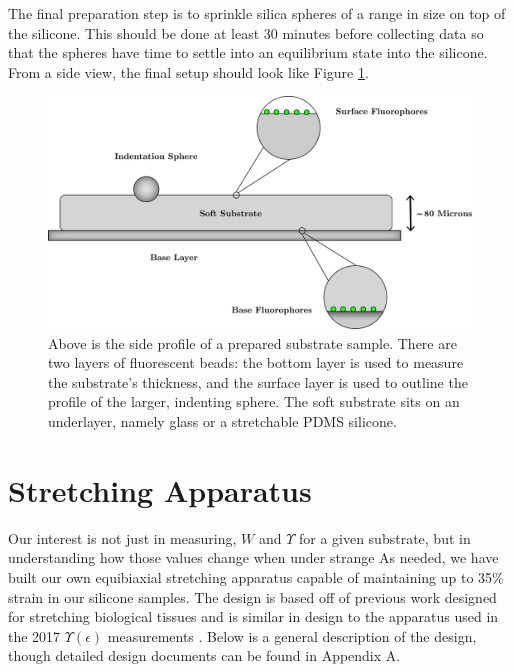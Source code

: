 The final preparation step is to sprinkle silica spheres of a range in size on top of the silicone. This should be done at least 30 minutes before collecting data so that the spheres have time to settle into an equilibrium state into the silicone. From a side view, the final setup should look like Figure \ref{fig:substrategraphic}.
\begin{figure}[h!]
	\centering
	\includegraphics[width=\linewidth]{Chapters/Figures/substrate_graphic_new}
	\caption[Prepared Substrate Profile]{Above is the side profile of a prepared substrate sample. There are two layers of fluorescent beads: the bottom layer is used to measure the substrate's thickness, and the surface layer is used to outline the profile of the larger, indenting sphere. The soft substrate sits on an underlayer, namely glass or a stretchable PDMS silicone.}
	\label{fig:substrategraphic}
\end{figure}


\section{Stretching Apparatus}
Our interest is not just in  measuring, $W$ and $\Upsilon$ for a given substrate, but in understanding how those values change when under strange As needed, we have built our own equibiaxial stretching apparatus capable of maintaining up to 35\% strain in our silicone samples. The design is based off of previous work designed for stretching biological tissues \cite{na2008time} and is similar in design to the apparatus used in the 2017 $\Upsilon(\epsilon)$ measurements \cite{xu2017direct}. Below is a general description of the design, though detailed design documents can be found in Appendix A.

